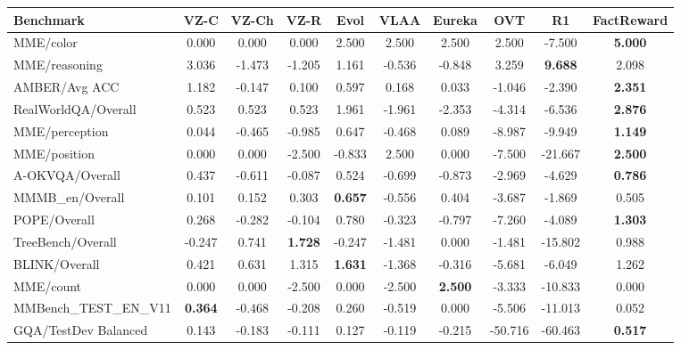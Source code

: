 \begin{table}[t]
\centering
\small
\begin{tabular}{lccccccccc}
\toprule
Benchmark & VZ-C & VZ-Ch & VZ-R & Evol & VLAA & Eureka & OVT & R1 & FactReward \\
\midrule
MME/color                    & 0.000 & 0.000 & 0.000 & 2.500 & 2.500 & 2.500 & 2.500 & -7.500 & \textbf{5.000} \\
MME/reasoning                & 3.036 & -1.473 & -1.205 & 1.161 & -0.536 & -0.848 & 3.259 & \textbf{9.688} & 2.098 \\
AMBER/Avg ACC                & 1.182 & -0.147 & 0.100 & 0.597 & 0.168 & 0.033 & -1.046 & -2.390 & \textbf{2.351} \\
RealWorldQA/Overall          & 0.523 & 0.523 & 0.523 & 1.961 & -1.961 & -2.353 & -4.314 & -6.536 & \textbf{2.876} \\
MME/perception               & 0.044 & -0.465 & -0.985 & 0.647 & -0.468 & 0.089 & -8.987 & -9.949 & \textbf{1.149} \\
MME/position                 & 0.000 & 0.000 & -2.500 & -0.833 & 2.500 & 0.000 & -7.500 & -21.667 & \textbf{2.500} \\
A-OKVQA/Overall              & 0.437 & -0.611 & -0.087 & 0.524 & -0.699 & -0.873 & -2.969 & -4.629 & \textbf{0.786} \\
MMMB\_en/Overall             & 0.101 & 0.152 & 0.303 & \textbf{0.657} & -0.556 & 0.404 & -3.687 & -1.869 & 0.505 \\
POPE/Overall                 & 0.268 & -0.282 & -0.104 & 0.780 & -0.323 & -0.797 & -7.260 & -4.089 & \textbf{1.303} \\
TreeBench/Overall            & -0.247 & 0.741 & \textbf{1.728} & -0.247 & -1.481 & 0.000 & -1.481 & -15.802 & 0.988 \\
BLINK/Overall                & 0.421 & 0.631 & 1.315 & \textbf{1.631} & -1.368 & -0.316 & -5.681 & -6.049 & 1.262 \\
MME/count                    & 0.000 & 0.000 & -2.500 & 0.000 & -2.500 & \textbf{2.500} & -3.333 & -10.833 & 0.000 \\
MMBench\_TEST\_EN\_V11       & \textbf{0.364} & -0.468 & -0.208 & 0.260 & -0.519 & 0.000 & -5.506 & -11.013 & 0.052 \\
GQA/TestDev Balanced         & 0.143 & -0.183 & -0.111 & 0.127 & -0.119 & -0.215 & -50.716 & -60.463 & \textbf{0.517} \\

\end{tabular}
\end{table}
